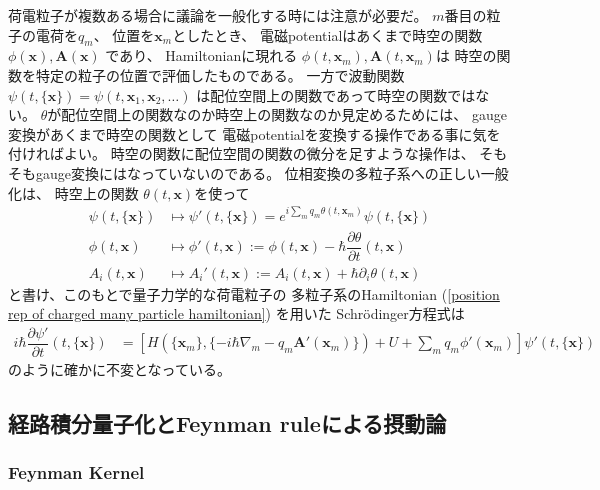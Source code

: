 荷電粒子が複数ある場合に議論を一般化する時には注意が必要だ。
$m$番目の粒子の電荷を$q_m$、
位置を$\bm{x}_m$としたとき、
電磁potentialはあくまで時空の関数
$\phi(\bm{x}), \bm{A} (\bm{x})$
であり、
Hamiltonianに現れる
$\phi(t, \bm{x}_m),
\bm{A} (t, \bm{x}_m)$は
時空の関数を特定の粒子の位置で評価したものである。
一方で波動関数
$\psi(t, \{\bm{x}\})
= \psi(t, \bm{x}_1, \bm{x}_2, \dots)$
は配位空間上の関数であって時空の関数ではない。
$\theta$が配位空間上の関数なのか時空上の関数なのか見定めるためには、
gauge変換があくまで時空の関数として
電磁potentialを変換する操作である事に気を付ければよい。
時空の関数に配位空間の関数の微分を足すような操作は、
そもそもgauge変換にはなっていないのである。
位相変換の多粒子系への正しい一般化は、
時空上の関数
$\theta (t, \bm{x})$を使って
\begin{subequations}
\begin{align}
    \psi (t, \{\bm{x}\}) &\mapsto
    \psi' (t, \{\bm{x}\})
    = e^{i \sum_m q_m \theta(t, \bm{x}_m)}
    \psi (t, \{\bm{x}\})
\\
    \phi (t, \bm{x}) &\mapsto
    \phi' (t, \bm{x}) :=
    \phi (t, \bm{x}) - \hbar
    \dfrac{\partial \theta}{\partial t} (t, \bm{x})
\\
    A_i (t, \bm{x}) &\mapsto
    A_i' (t, \bm{x}) :=
    A_i (t, \bm{x}) + \hbar
    \partial_i \theta (t, \bm{x})
\end{align}
\end{subequations}
と書け、このもとで量子力学的な荷電粒子の
多粒子系のHamiltonian
(\ref{position rep of charged many particle hamiltonian})
を用いた
Schr\"odinger方程式は
\begin{align}
    i\hbar
    \dfrac{\partial \psi'}{\partial t}
    (t, \{\bm{x}\})
&=
    \left[
      H (\{\bm{x}_m\},
        \{- i \hbar \nabla_m
        - q_m \bm{A}' (\bm{x}_m)\})
      + U
      + \sum_m q_m \phi' (\bm{x}_m)
    \right]
    \psi'
    (t, \{\bm{x}\})
\end{align}
のように確かに不変となっている。

\subsection{経路積分量子化とFeynman ruleによる摂動論}

\subsubsection{Feynman Kernel}

